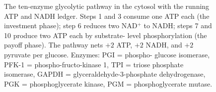 \begin{figure}[htbp]
\caption[Glycolysis pathway and ATP ledger]{The ten-enzyme glycolytic
pathway in the cytosol with the running ATP and NADH ledger. Steps 1
and 3 consume one ATP each (the investment phase); step 6 reduces two
NAD$^+$ to NADH; steps 7 and 10 produce two ATP each by substrate-
level phosphorylation (the payoff phase). The pathway nets $+2$ ATP,
$+2$ NADH, and $+2$ pyruvate per glucose. Enzymes: PGI = phospho-
glucose isomerase, PFK-1 = phospho-fructo-kinase 1, TPI = triose
phosphate isomerase, GAPDH = glyceraldehyde-3-phosphate dehydrogenase,
PGK = phosphoglycerate kinase, PGM = phosphoglycerate mutase.}
\label{fig:vol06:ch02:glycolysis}
\end{figure}
